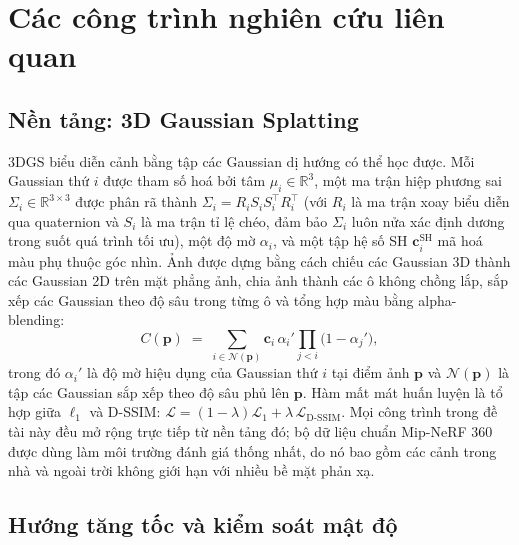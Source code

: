 \newpage
\section{Các công trình nghiên cứu liên quan}

    \subsection{Nền tảng: 3D Gaussian Splatting}
    3DGS \cite{kerbl3dgs} biểu diễn cảnh bằng tập các Gaussian dị hướng có thể học
    được. Mỗi Gaussian thứ $i$ được tham số hoá bởi tâm $\mu_i \in \mathbb{R}^3$,
    một ma trận hiệp phương sai $\Sigma_i \in \mathbb{R}^{3\times 3}$ được phân rã
    thành $\Sigma_i = R_i S_i S_i^\top R_i^\top$ (với $R_i$ là ma trận xoay biểu
    diễn qua quaternion và $S_i$ là ma trận tỉ lệ chéo, đảm bảo $\Sigma_i$ luôn nửa
    xác định dương trong suốt quá trình tối ưu), một độ mờ $\alpha_i$, và một tập hệ
    số SH $\mathbf{c}_i^{\text{SH}}$ mã hoá màu phụ thuộc góc nhìn. Ảnh được dựng
    bằng cách chiếu các Gaussian 3D thành các Gaussian 2D trên mặt phẳng ảnh, chia
    ảnh thành các ô không chồng lắp, sắp xếp các Gaussian theo độ sâu trong từng ô
    và tổng hợp màu bằng alpha-blending:
    \[
        C(\mathbf{p}) \;=\; \sum_{i \in \mathcal{N}(\mathbf{p})}
        \mathbf{c}_i \, \alpha_i' \prod_{j<i}\big(1 - \alpha_j'\big),
    \]
    trong đó $\alpha_i'$ là độ mờ hiệu dụng của Gaussian thứ $i$ tại điểm ảnh
    $\mathbf{p}$ và $\mathcal{N}(\mathbf{p})$ là tập các Gaussian sắp xếp theo độ sâu
    phủ lên $\mathbf{p}$. Hàm mất mát huấn luyện là tổ hợp giữa $\ell_1$ và D-SSIM:
    $\mathcal{L} = (1-\lambda)\mathcal{L}_1 + \lambda\,\mathcal{L}_{\text{D-SSIM}}$.
    Mọi công trình trong đề tài này đều mở rộng trực tiếp từ nền tảng đó; bộ dữ liệu
    chuẩn Mip-NeRF 360 \cite{mipnerf360} được dùng làm môi trường đánh giá thống
    nhất, do nó bao gồm các cảnh trong nhà và ngoài trời không giới hạn với nhiều bề
    mặt phản xạ.

    \subsection{Hướng tăng tốc và kiểm soát mật độ}
